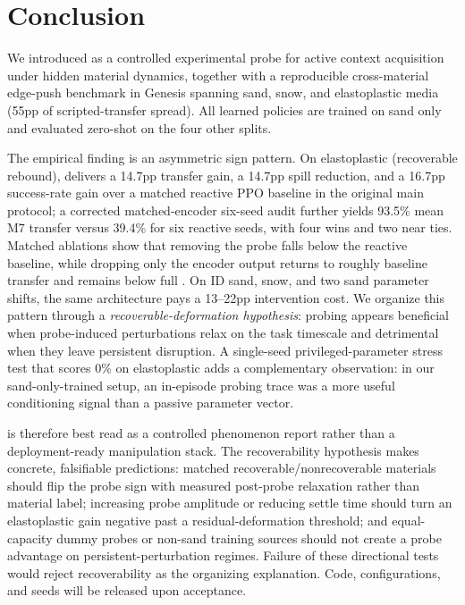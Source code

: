 \section{Conclusion}
\label{sec:conclusion}

We introduced \PTA{} as a controlled experimental probe for active context acquisition under hidden material dynamics, together with a reproducible cross-material edge-push benchmark in Genesis spanning sand, snow, and elastoplastic media (55pp of scripted-transfer spread). All learned policies are trained on sand only and evaluated zero-shot on the four other splits.

The empirical finding is an asymmetric sign pattern. On elastoplastic (recoverable rebound), \PTA{} delivers a 14.7pp transfer gain, a 14.7pp spill reduction, and a 16.7pp success-rate gain over a matched reactive PPO baseline in the original main protocol; a corrected matched-encoder six-seed audit further yields 93.5\% mean M7 transfer versus 39.4\% for six reactive seeds, with four wins and two near ties. Matched ablations show that removing the probe falls below the reactive baseline, while dropping only the encoder output returns to roughly baseline transfer and remains below full \PTA{}. On ID sand, snow, and two sand parameter shifts, the same architecture pays a 13--22pp intervention cost. We organize this pattern through a \emph{recoverable-deformation hypothesis}: probing appears beneficial when probe-induced perturbations relax on the task timescale and detrimental when they leave persistent disruption. A single-seed privileged-parameter stress test that scores 0\% on elastoplastic adds a complementary observation: in our sand-only-trained setup, an in-episode probing trace was a more useful conditioning signal than a passive parameter vector.

\PTA{} is therefore best read as a controlled phenomenon report rather than a deployment-ready manipulation stack. The recoverability hypothesis makes concrete, falsifiable predictions: matched recoverable/nonrecoverable materials should flip the probe sign with measured post-probe relaxation rather than material label; increasing probe amplitude or reducing settle time should turn an elastoplastic gain negative past a residual-deformation threshold; and equal-capacity dummy probes or non-sand training sources should not create a probe advantage on persistent-perturbation regimes. Failure of these directional tests would reject recoverability as the organizing explanation. Code, configurations, and seeds will be released upon acceptance.
